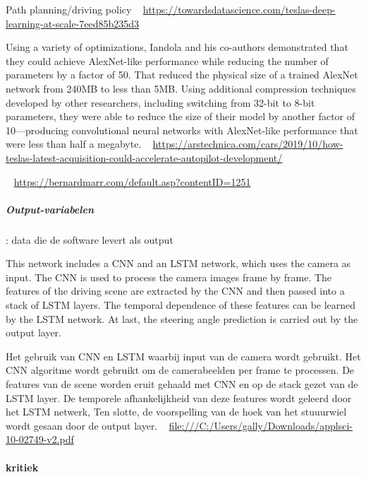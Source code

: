 \documentclass{article}
\begin{document}
Path planning/driving policy
~\cite{tesladeep}
\url{https://towardsdatascience.com/teslas-deep-learning-at-scale-7eed85b235d3}

Using a variety of optimizations, Iandola and his co-authors demonstrated that they could achieve AlexNet-like performance while reducing the number of parameters by a factor of 50. That reduced the physical size of a trained AlexNet network from 240MB to less than 5MB. Using additional compression techniques developed by other researchers, including switching from 32-bit to 8-bit parameters, they were able to reduce the size of their model by another factor of 10—producing convolutional neural networks with AlexNet-like performance that were less than half a megabyte.
~\cite{tesla_acc}
\url{https://arstechnica.com/cars/2019/10/how-teslas-latest-acquisition-could-accelerate-autopilot-development/}

~\cite{bernardmarr}
\url{https://bernardmarr.com/default.asp?contentID=1251}




\subparagraph{Output-variabelen}: data die de software levert als output

This network includes a CNN and an LSTM network, which uses the camera as input.
The CNN is used to process the camera images frame by frame. The features of the driving scene are
extracted by the CNN and then passed into a stack of LSTM layers. The temporal dependence of these
features can be learned by the LSTM network. At last, the steering angle prediction is carried out by
the output layer.

Het gebruik van CNN en LSTM waarbij input van de camera wordt gebruikt. Het CNN algoritme wordt gebruikt om de camerabeelden per frame te processen. De features van de scene worden eruit gehaald met CNN en op de stack gezet van de LSTM layer. De temporele afhankelijkheid van deze features wordt geleerd door het LSTM netwerk, Ten slotte, de voorspelling van de hoek van het stuuurwiel wordt gesaan door de output layer.
~\cite{teslaapplsci}
\url{file:///C:/Users/gally/Downloads/applsci-10-02749-v2.pdf}



\paragraph{kritiek}
\end{document}
